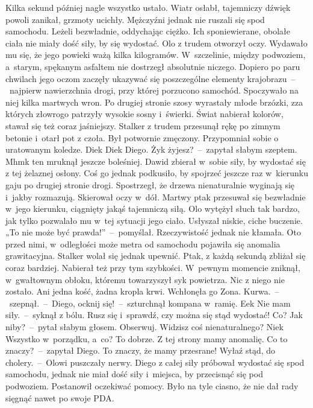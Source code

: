 \documentclass[../MAIN.tex]{subfiles}
\begin{document}
Kilka sekund później nagle wszystko ustało. Wiatr osłabł, tajemniczy dźwięk powoli zanikał, grzmoty ucichły. Mężczyźni jednak nie ruszali się spod samochodu. Leżeli bezwładnie, oddychając ciężko. Ich sponiewierane, obolałe ciała nie miały dość siły, by się wydostać. Olo z trudem otworzył oczy. Wydawało mu się, że jego powieki ważą kilka kilogramów. W~szczelinie, między podwoziem, a~starym, spękanym asfaltem nie dostrzegł absolutnie niczego. Dopiero po paru chwilach jego oczom zaczęły ukazywać się poszczególne elementy krajobrazu~--~najpierw nawierzchnia drogi, przy której porzucono samochód. Spoczywało na niej kilka martwych wron. Po drugiej stronie szosy wyrastały młode brzózki, zza których złowrogo patrzyły wysokie sosny i~świerki. Świat nabierał kolorów, stawał się też coraz jaśniejszy. Stalker z trudem przesunął rękę po zimnym betonie i~otarł pot z czoła. Był potwornie zmęczony. Przypomniał sobie o uratowanym koledze.
\sx Die\3k Die\3k Diego. Ży\3k żyjesz?~--~zapytał słabym szeptem.
\xx Mhm\3k \x ten mruknął jeszcze boleśniej.
\qm
Dawid zbierał w~sobie siły, by wydostać się z tej żelaznej osłony. Coś go jednak podkusiło, by spojrzeć jeszcze raz w~kierunku gaju po drugiej stronie drogi. Spostrzegł, że drzewa nienaturalnie wyginają się i~jakby rozmazują. Skierował oczy w~dół. Martwy ptak przesuwał się bezwładnie w~jego kierunku, ciągnięty jakąś tajemniczą siłą. Olo wytężył słuch tak bardzo, jak tylko pozwalało mu w~tej sytuacji jego ciało. Usłyszał niskie, ciche buczenie. „To nie może być prawda!”~--~pomyślał. Rzeczywistość jednak nie kłamała. Oto przed nimi, w~odległości może metra od samochodu pojawiła się anomalia grawitacyjna. Stalker wolał się jednak upewnić. Ptak, z każdą sekundą zbliżał się coraz bardziej. Nabierał też przy tym szybkości. W~pewnym momencie zniknął, w~gwałtownym obłoku, któremu towarzyszył syk powietrza. Nic z niego nie zostało. Ani jedna kość, żadna kropla krwi. Wchłonęła go Zona.
\sx Kurwa.~--~szepnął.~--~Diego, ocknij się!~--~szturchnął kompana w~ramię.
\xx Ee\3k Nie mam siły.~--~syknął z bólu.
\xx Rusz się i~sprawdź, czy można się stąd wydostać!
\xx Co? Jak niby?~--~pytał słabym głosem.
\xx Obserwuj. Widzisz coś nienaturalnego?
\xx Nie\3k Wszystko w~porządku, a~co?
\xx To dobrze. Z tej strony mamy anomalię.
\xx Co to znaczy?~--~zapytał Diego.
\xx To znaczy, że mamy przesrane! Wyłaź stąd, do cholery.~--~Olowi puszczały nerwy.
\qm
Diego z całej siły próbował wydostać się spod samochodu, jednak nie miał dość siły i~miejsca, by przecisnąć się pod podwoziem. Postanowił oczekiwać pomocy. Było na tyle ciasno, że nie dał rady sięgnąć nawet po swoje PDA.
\end{document}
